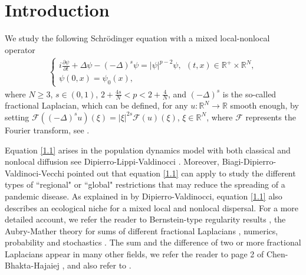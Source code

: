 \documentclass[12pt,a4paper,reqno]{amsart}
\numberwithin{equation}{section}
\begin{document}
\section{Introduction}
We study the following  Schr\"{o}dinger equation with a mixed local-nonlocal operator
\begin{equation}\label{1.1}
\begin{aligned}
\begin{cases}
i\frac{\partial \psi}{\partial t}
+\Delta \psi
-(-\Delta)^{s}\psi=|\psi|^{p-2}\psi, \ \ (t,x)\in \mathbb{R}^{+}\times\mathbb{R}^{N},\\
\psi(0,x)=\psi_{0}(x),
\end{cases}
\end{aligned}
\end{equation}
where $N\geqslant3$, $s\in(0,1)$, $2+\frac{4s}{N}<p<2+\frac{4}{N}$,
and $(-\Delta)^{s}$ is the so-called fractional
Laplacian, which can be defined, for any $u:\mathbb{R}^{N}\to\mathbb{R}$ smooth enough, by setting
$
\mathcal{F}((-\Delta)^{s}u)(\xi)
=
|\xi|^{2s}
\mathcal{F}(u)(\xi)
$,
$\xi\in\mathbb{R}^{N}$,
where $\mathcal{F}$ represents the Fourier transform, see \cite{Nezza-Palatucci-Valdinoci2012BSM}.


Equation \eqref{1.1} arises in the population dynamics model with both classical and nonlocal diffusion see Dipierro-Lippi-Valdinocci \cite{Dipierro-Lippi-Valdinocci2022AIHP}.
Moreover, Biagi-Dipierro-Valdinoci-Vecchi \cite{Biagi-Dipierro-Valdinoci-Vecchi2021CPDE} pointed out that equation \eqref{1.1} can apply to study the different types of ``regional" or ``global" restrictions that may reduce the spreading of a pandemic disease.
As explained in \cite{Dipierro-Valdinocci2021PA} by Dipierro-Valdinocci,
equation \eqref{1.1} also describes an ecological niche for a mixed local and nonlocal dispersal.
For a more detailed account, we refer the reader to Bernstein-type regularity results
\cite{Cabre-Dipierro-Valdinoci2022ARMA},
the Aubry-Mather theory for sums of different fractional Laplacians
\cite{Llave-Valdinoci2009Poincare}, numerics\cite{Biswas-Jakobsen-Karlsen2010SIAM-J-N-A},
probability and stochastics
\cite{Mimica2016PLMS,ChenZQ-Kim-Song-Vondracek2012TAMS}.
The sum and the difference of two or more fractional Laplacians appear
in many other fields, we refer the reader to page 2 of Chen-Bhakta-Hajaiej \cite{ChenHY-Bhakta-Hajaiej2022JDE},
and also refer to \cite{Hajaiej-Perera2022DIE,Maione-Mugnai-Vecchi2023FFAC,Cangiotti-Caponi-Maione-Vitillaro2023Milan,Cangiotti-Caponi-Maione-Vitillaro2024FFAC,Giovannardi-Mugnai-Vecchi2023JMAA}.
\end{document}
